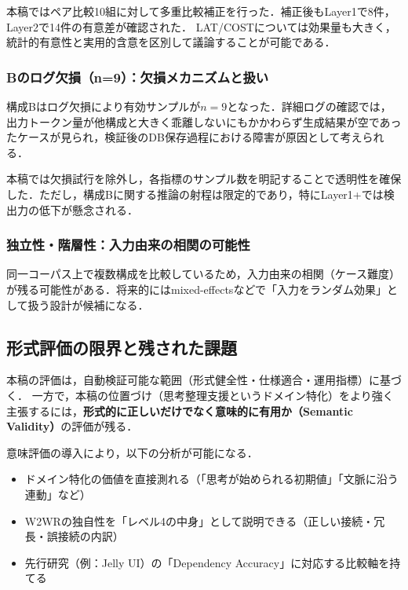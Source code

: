 \documentclass[a4paper,10pt]{jarticle}
\begin{document}
本稿ではペア比較10組に対して多重比較補正を行った．補正後もLayer1で8件，Layer2で14件の有意差が確認された．
LAT/COSTについては効果量も大きく，統計的有意性と実用的含意を区別して議論することが可能である．

\subsubsection{Bのログ欠損（n=9）：欠損メカニズムと扱い}
\label{subsubsec:disc_threats_missing}

構成Bはログ欠損により有効サンプルが$n=9$となった．詳細ログの確認では，出力トークン量が他構成と大きく乖離しないにもかかわらず生成結果が空であったケースが見られ，検証後のDB保存過程における障害が原因として考えられる．

本稿では欠損試行を除外し，各指標のサンプル数を明記することで透明性を確保した．ただし，構成Bに関する推論の射程は限定的であり，特にLayer1+では検出力の低下が懸念される．

\subsubsection{独立性・階層性：入力由来の相関の可能性}
\label{subsubsec:disc_threats_independence}

同一コーパス上で複数構成を比較しているため，入力由来の相関（ケース難度）が残る可能性がある．将来的にはmixed-effectsなどで「入力をランダム効果」として扱う設計が候補になる．

\subsection{形式評価の限界と残された課題}
\label{subsec:disc_future}

本稿の評価は，自動検証可能な範囲（形式健全性・仕様適合・運用指標）に基づく．
一方で，本稿の位置づけ（思考整理支援というドメイン特化）をより強く主張するには，\textbf{形式的に正しいだけでなく意味的に有用か（Semantic Validity）}の評価が残る．

意味評価の導入により，以下の分析が可能になる．
\begin{itemize}
\item ドメイン特化の価値を直接測れる（「思考が始められる初期値」「文脈に沿う連動」など）
\item W2WRの独自性を「レベル4の中身」として説明できる（正しい接続・冗長・誤接続の内訳）
\item 先行研究（例：Jelly UI）の「Dependency Accuracy」に対応する比較軸を持てる
\end{itemize}
\end{document}
